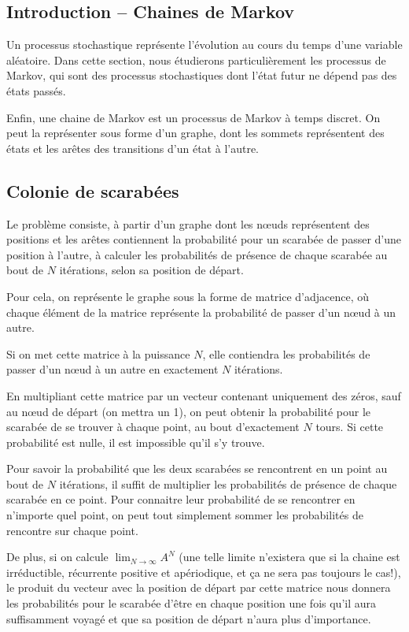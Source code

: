 \subsection{Introduction -- Chaines de Markov}
  Un processus stochastique représente l'évolution au cours du temps d'une
  variable aléatoire. Dans cette section, nous étudierons particulièrement les
  processus de Markov, qui sont des processus stochastiques dont l'état futur
  ne dépend pas des états passés.

  Enfin, une chaine de Markov est un processus de Markov à temps discret. On
  peut la représenter sous forme d'un graphe, dont les sommets représentent des
  états et les arêtes des transitions d'un état à l'autre.

\subsection{Colonie de scarabées}
  Le problème consiste, à partir d'un graphe dont les nœuds représentent des
  positions et les arêtes contiennent la probabilité pour un scarabée de passer
  d'une position à l'autre, à calculer les probabilités de présence de chaque
  scarabée au bout de $N$ itérations, selon sa position de départ.

  Pour cela, on représente le graphe sous la forme de matrice d'adjacence, où
  chaque élément de la matrice représente la probabilité de passer d'un nœud à
  un autre.

  Si on met cette matrice à la puissance $N$, elle contiendra les probabilités
  de passer d'un nœud à un autre en exactement $N$ itérations.

  En multipliant cette matrice par un vecteur contenant uniquement des zéros,
  sauf au nœud de départ (on mettra un 1), on peut obtenir la probabilité pour
  le scarabée de se trouver à chaque point, au bout d'exactement $N$ tours.  Si
  cette probabilité est nulle, il est impossible qu'il s'y trouve.

  Pour savoir la probabilité que les deux scarabées se rencontrent en un point
  au bout de $N$ itérations, il suffit de multiplier les probabilités de
  présence de chaque scarabée en ce point. Pour connaitre leur probabilité de se
  rencontrer en n'importe quel point, on peut tout simplement sommer les
  probabilités de rencontre sur chaque point.

  De plus, si on calcule $\lim_{N \to \infty} A^N$ (une telle limite n'existera
  que si la chaine est irréductible, récurrente positive et apériodique, et ça
  ne sera pas toujours le cas!), le produit du vecteur avec la position de
  départ par cette matrice nous donnera les probabilités pour le scarabée
  d'être en chaque position une fois qu'il aura suffisamment voyagé et que sa
  position de départ n'aura plus d'importance.

